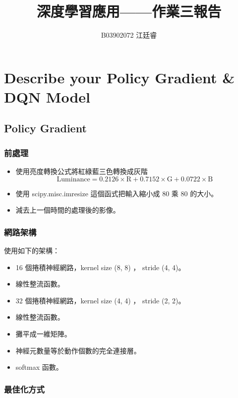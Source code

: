 \documentclass[fleqn,a4paper,12pt]{article}
\title{深度學習應用——作業三報告}
\author{B03902072 江廷睿}
\date{}
\begin{document}
\maketitle
\thispagestyle{fancy}

\section{Describe your Policy Gradient \& DQN Model}

\subsection{Policy Gradient}

\subsubsection*{前處理}

\begin{itemize}
\item 使用亮度轉換公式將紅綠藍三色轉換成灰階
  \begin{equation*}
    \text{Luminance} = 0.2126 \times \text{R} + 0.7152 \times \text{G} + 0.0722 \times \text{B}    
  \end{equation*}
\item 使用 scipy.misc.imresize 這個函式把輸入縮小成 80 乘 80 的大小。
\item 減去上一個時間的處理後的影像。
\end{itemize}


\subsubsection*{網路架構}

使用如下的架構：

\begin{itemize}
\item 16 個捲積神經網路，kernel size (8, 8) ， stride (4, 4)。
\item 線性整流函數。
\item 32 個捲積神經網路，kernel size (4, 4) ， stride (2, 2)。
\item 線性整流函數。
\item 攤平成一維矩陣。
\item 神經元數量等於動作個數的完全連接層。
\item softmax 函數。
\end{itemize}

\subsubsection*{最佳化方式}
\end{document}
